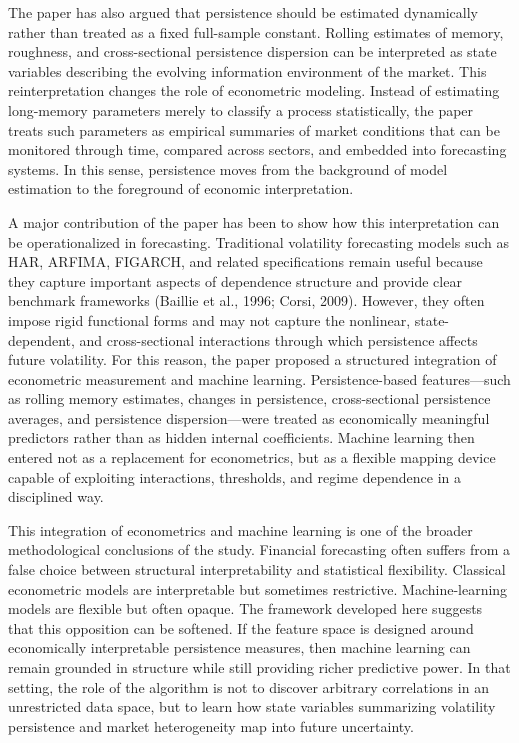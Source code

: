 \documentclass[12pt]{article}
\begin{document}
The paper has also argued that persistence should be estimated dynamically rather than treated as a fixed full-sample constant. Rolling estimates of memory, roughness, and cross-sectional persistence dispersion can be interpreted as state variables describing the evolving information environment of the market. This reinterpretation changes the role of econometric modeling. Instead of estimating long-memory parameters merely to classify a process statistically, the paper treats such parameters as empirical summaries of market conditions that can be monitored through time, compared across sectors, and embedded into forecasting systems. In this sense, persistence moves from the background of model estimation to the foreground of economic interpretation.

A major contribution of the paper has been to show how this interpretation can be operationalized in forecasting. Traditional volatility forecasting models such as HAR, ARFIMA, FIGARCH, and related specifications remain useful because they capture important aspects of dependence structure and provide clear benchmark frameworks (Baillie et al., 1996; Corsi, 2009). However, they often impose rigid functional forms and may not capture the nonlinear, state-dependent, and cross-sectional interactions through which persistence affects future volatility. For this reason, the paper proposed a structured integration of econometric measurement and machine learning. Persistence-based features---such as rolling memory estimates, changes in persistence, cross-sectional persistence averages, and persistence dispersion---were treated as economically meaningful predictors rather than as hidden internal coefficients. Machine learning then entered not as a replacement for econometrics, but as a flexible mapping device capable of exploiting interactions, thresholds, and regime dependence in a disciplined way.

This integration of econometrics and machine learning is one of the broader methodological conclusions of the study. Financial forecasting often suffers from a false choice between structural interpretability and statistical flexibility. Classical econometric models are interpretable but sometimes restrictive. Machine-learning models are flexible but often opaque. The framework developed here suggests that this opposition can be softened. If the feature space is designed around economically interpretable persistence measures, then machine learning can remain grounded in structure while still providing richer predictive power. In that setting, the role of the algorithm is not to discover arbitrary correlations in an unrestricted data space, but to learn how state variables summarizing volatility persistence and market heterogeneity map into future uncertainty.
\end{document}

